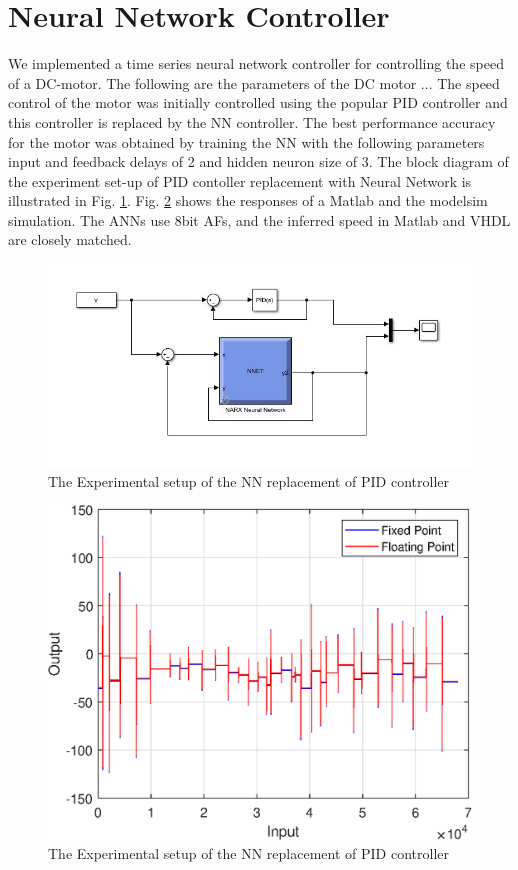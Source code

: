 \documentclass{article}
\begin{document}
\section{Neural Network Controller}
We implemented a time series neural network controller for controlling the speed of a DC-motor. The following are the parameters of the DC motor ... The speed control of the motor was initially controlled using the popular PID controller and this controller is replaced by the NN controller. The best performance accuracy for the motor was obtained by training the NN with the following parameters input and feedback delays of 2 and hidden neuron size of 3. The block diagram of the experiment set-up of PID contoller replacement with Neural Network is illustrated in Fig. \ref{fig:pidNN}. Fig. \ref{fig:res_pidNN} shows the responses of a Matlab and the modelsim simulation. The ANNs use 8bit AFs, and the inferred speed in Matlab and VHDL are closely matched.


\begin{figure}
\centering
\includegraphics[scale=0.65]{PID_NN.jpg}
\caption{\label{fig:pidNN} The Experimental setup of the NN replacement of PID controller}
\end{figure}


\begin{figure}
\centering
\includegraphics[scale=0.65]{NNpid.eps}
\caption{\label{fig:res_pidNN} The Experimental setup of the NN replacement of PID controller}
\end{figure}
\end{document}
